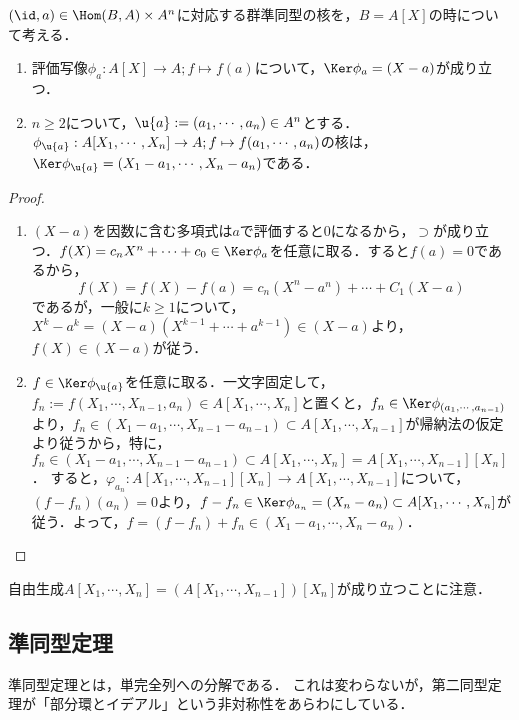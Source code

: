 \documentclass[uplatex,dvipdfmx]{jsreport}
\begin{document}
\begin{example}\label{exp-factor-theorem}
    $(\id,a)\in\Hom(B,A)\times A^n$に対応する群準同型の核を，$B=A[X]$の時について考える．
    \begin{enumerate}
        \item 評価写像$\phi_a:A[X]\to A;f\mapsto f(a)$について，$\Ker\phi_a=(X-a)$が成り立つ．
        \item $n\ge 2$について，$\u{a}:=(a_1,\cdots,a_n)\in A^n$とする．$\phi_{\u{a}}:A[X_1,\cdots,X_n]\to A;f\mapsto f(a_1,\cdots,a_n)$の核は，$\Ker\phi_{\u{a}}=(X_1-a_1,\cdots,X_n-a_n)$である．
    \end{enumerate}
\end{example}
\begin{proof}\mbox{}
    \begin{enumerate}
        \item $(X-a)$を因数に含む多項式は$a$で評価すると$0$になるから，$\supset$が成り立つ．$f(X)=c_nX^n+\cdots+c_0\in\Ker\phi_a$を任意に取る．すると$f(a)=0$であるから，
        \[f(X)=f(X)-f(a)=c_n(X^n-a^n)+\cdots+C_1(X-a)\]
        であるが，一般に$k\ge 1$について，$X^k-a^k=(X-a)(X^{k-1}+\cdots+a^{k-1})\in(X-a)$より，$f(X)\in(X-a)$が従う．
        \item $f\in\Ker\phi_{\u{a}}$を任意に取る．一文字固定して，$f_n:=f(X_1,\cdots,X_{n-1},a_n)\in A[X_1,\cdots,X_n]$と置くと，$f_n\in\Ker\phi_{(a_1,\cdots,a_{n-1})}$より，$f_n\in(X_1-a_1,\cdots,X_{n-1}-a_{n-1})\subset A[X_1,\cdots,X_{n-1}]$が帰納法の仮定より従うから，特に，$f_n\in(X_1-a_1,\cdots,X_{n-1}-a_{n-1})\subset A[X_1,\cdots,X_{n}]=A[X_1,\cdots,X_{n-1}][X_n]$．
        すると，$\varphi_{a_n}:A[X_1,\cdots,X_{n-1}][X_n]\to A[X_1,\cdots,X_{n-1}]$について，$(f-f_n)(a_n)=0$より，$f-f_n\in\Ker\phi_{a_n}=(X_n-a_n)\subset A[X_1,\cdots,X_n]$が従う．よって，$f=(f-f_n)+f_n\in(X_1-a_1,\cdots,X_n-a_n)$．
    \end{enumerate}
\end{proof}
\begin{remarks}
    自由生成$A[X_1,\cdots,X_n]=(A[X_1,\cdots,X_{n-1}])[X_n]$が成り立つことに注意．
\end{remarks}

\subsection{準同型定理}

\begin{tcolorbox}[colframe=ForestGreen, colback=ForestGreen!10!white,breakable,colbacktitle=ForestGreen!40!white,coltitle=black,fonttitle=\bfseries\sffamily,
title=]
    準同型定理とは，単完全列への分解である．
    これは変わらないが，第二同型定理が「部分環とイデアル」という非対称性をあらわにしている．
\end{tcolorbox}
\end{document}
